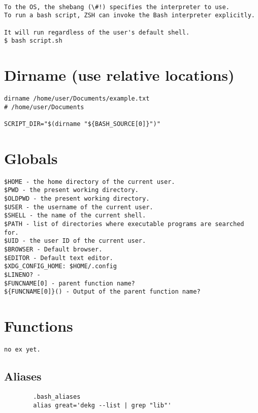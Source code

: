 \begin{verbatim}

To the OS, the shebang (\#!) specifies the interpreter to use.
To run a bash script, ZSH can invoke the Bash interpreter explicitly.

It will run regardless of the user's default shell.
$ bash script.sh
\end{verbatim}

\section{Dirname (use relative locations)}

\begin{verbatim}
dirname /home/user/Documents/example.txt
# /home/user/Documents

SCRIPT_DIR="$(dirname "${BASH_SOURCE[0]}")"
\end{verbatim}

\section{Globals}
\begin{verbatim}
$HOME - the home directory of the current user.
$PWD - the present working directory.
$OLDPWD - the present working directory.
$USER - the username of the current user.
$SHELL - the name of the current shell.
$PATH - list of directories where executable programs are searched for.
$UID - the user ID of the current user.
$BROWSER - Default browser.
$EDITOR - Default text editor.
$XDG_CONFIG_HOME: $HOME/.config
$LINENO? -
$FUNCNAME[0] - parent function name?
${FUNCNAME[0]}() - Output of the parent function name?
\end{verbatim}

\section{Functions}

\begin{verbatim}
no ex yet.
\end{verbatim}

\subsection{Aliases}

\begin{verbatim}
        .bash_aliases
        alias great='dekg --list | grep "lib"'
\end{verbatim}

